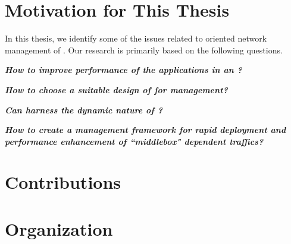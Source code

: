 \section{Motivation for This Thesis}
In this thesis, we identify some of the issues related to  oriented network management of . Our research is primarily based on the following questions.
\begin{question}
\label{C0:Q1}
 \emph{\bf How to improve performance of the applications in an ?}
\end{question}
        
\begin{question}
\label{C0:Q2}
 \emph{\bf How to choose a suitable design of  for  management?}
\end{question}
        
\begin{question}
\label{C0:Q3}
 \emph{\bf Can  harness the dynamic nature of ?}
\end{question}
        
\begin{question}
\label{C0:Q4}
 \emph{\bf How to create a management framework for rapid deployment and performance enhancement of ``middlebox" dependent traffics?}
\end{question}
        
 \section{Contributions}
     
\section{Organization}
     

